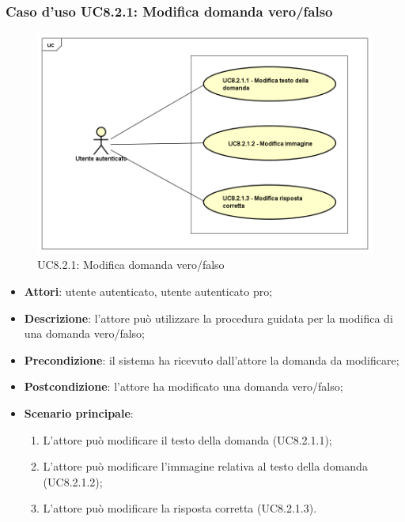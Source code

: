 \subsubsection{Caso d'uso UC8.2.1: Modifica domanda vero/falso}
	\label{UC8.2.1}
	\begin{figure}[ht]
		\centering
			\includegraphics[scale=0.45,keepaspectratio]{UML/UC8_2_1.png}
		\caption{UC8.2.1: Modifica domanda vero/falso}
	\end{figure}
	\FloatBarrier
	\begin{itemize}
		\item
			\textbf{Attori}: utente autenticato, utente autenticato pro;
		\item		
			\textbf{Descrizione}: l'attore può utilizzare la procedura guidata per la modifica di una domanda vero/falso;
		\item
			\textbf{Precondizione}: il sistema ha ricevuto dall'attore la domanda da modificare;  
		\item
			\textbf{Postcondizione}: l'attore ha modificato una domanda vero/falso;
		\item
			\textbf{Scenario principale}:
	       		\begin{enumerate}
	       			\item
	       			L'attore può modificare il testo della domanda (UC8.2.1.1);
	       			\item
	       			L'attore può modificare l'immagine relativa al testo della domanda (UC8.2.1.2);
					\item
					L'attore può modificare la risposta corretta (UC8.2.1.3).
	 			\end{enumerate}
	\end{itemize}
	
